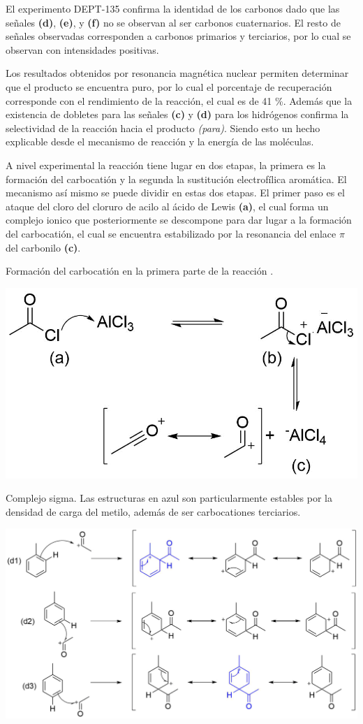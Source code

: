 \documentclass[fleqn,11pt]{SelfArx}
\begin{document}
El experimento DEPT-135 confirma la identidad de los carbonos dado que las señales \textbf{(d)}, \textbf{(e)}, y \textbf{(f)} no se observan al ser carbonos cuaternarios. El resto de señales observadas corresponden a carbonos primarios y terciarios, por lo cual se observan con intensidades positivas.

Los resultados obtenidos por resonancia magnética nuclear permiten determinar que el producto se encuentra puro, por lo cual el porcentaje de recuperación corresponde con el rendimiento de la reacción, el cual es de 41 \%. Además que la existencia de dobletes para las señales \textbf{(c)} y \textbf{(d)} para los hidrógenos confirma la selectividad de la reacción hacia el producto \textit{(para)}. Siendo esto un hecho explicable desde el mecanismo de reacción y la energía de las moléculas.

A nivel experimental la reacción tiene lugar en dos etapas, la primera es la formación del carbocatión y la segunda la sustitución electrofílica aromática. El mecanismo así mismo se puede dividir en estas dos etapas. El primer paso es el ataque del cloro del cloruro de acilo al ácido de Lewis \textbf{(a)}, el cual forma un complejo ionico que posteriormente se descompone para dar lugar a la formación del carbocatión, el cual se encuentra estabilizado por la resonancia del enlace $\pi$ del carbonilo \textbf{(c)}.
\begin{scheme}[h]
	\centering
	\caption{Formación del carbocatión en la primera parte de la reacción \cite{Wade2013}.}
	\includegraphics[width=0.9\linewidth]{structures/mechanism1.png}
\end{scheme}

\begin{scheme*}[h]
	\centering
	\caption{Complejo sigma. Las estructuras en azul son particularmente estables por la densidad de carga del metilo, además de ser carbocationes terciarios.}
	\includegraphics[width=0.7\linewidth]{structures/SigmaComplex.png}
	\label{sch: sigma}
\end{scheme*}
\end{document}
